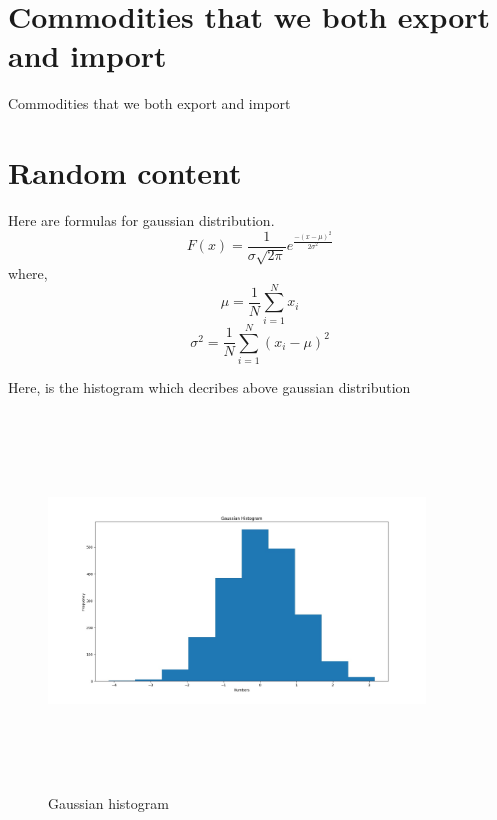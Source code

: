 \documentclass[12pt]{article}
\begin{document}
\pagebreak
\section{Commodities that we both export and import}
\begin{table}[H]
	\centering
	
	\label{Commodities that we both export and import}
	\caption{Commodities that we both export and import}
\end{table}

\pagebreak

\section{Random content}

Here are formulas for gaussian distribution.
\begin{equation}
	F (x) = \frac{1}{\sigma \sqrt {2\pi}}e^{\frac{ - \left( {x - \mu } \right)^2}{2\sigma^2}}
\end{equation}
where,
\begin{equation}
	\mu = \frac{1}{N}\sum_{i = 1}^{N}x_i
\end{equation}
\begin{equation}
	\sigma^2 = \frac{1}{N}\sum_{i=1}^{N}(x_i - \mu)^2
\end{equation}

Here, is the histogram which decribes above gaussian distribution
\begin{figure}[H]
\centering
	\includegraphics[height=10cm,width=10cm]{image_3.jpg}
	\caption{Gaussian histogram}
	\label{Gaussian histogram}
\end{figure}
\end{document}
